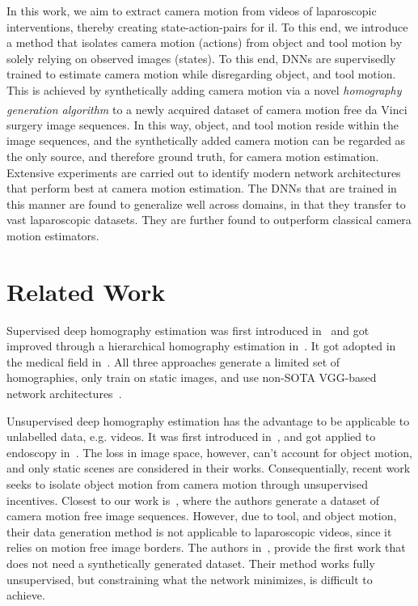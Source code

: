 In this work, we aim to extract camera motion from videos of laparoscopic interventions, thereby creating state-action-pairs for \acrshort{il}. To this end, we introduce a method that isolates camera motion (actions) from object and tool motion by solely relying on observed images (states). To this end, DNNs are supervisedly trained to estimate camera motion while disregarding object, and tool motion. This is achieved by synthetically adding camera motion via a novel \textit{homography generation algorithm} to a newly acquired dataset of camera motion free da Vinci\textsuperscript{\textregistered} surgery image sequences. In this way, object, and tool motion reside within the image sequences, and the synthetically added camera motion can be regarded as the only source, and therefore ground truth, for camera motion estimation. Extensive experiments are carried out to identify modern network architectures that perform best at camera motion estimation. The DNNs that are trained in this manner are found to generalize well across domains, in that they transfer to vast laparoscopic datasets. They are further found to outperform classical camera motion estimators.

\section{Related Work}

Supervised deep homography estimation was first introduced in~\cite{detone2016deep} and got improved through a hierarchical homography estimation in~\cite{erlik2017homography}. It got adopted in the medical field in~\cite{bano2020deep}. All three approaches generate a limited set of homographies, only train on static images, and use non-SOTA VGG-based network architectures~\cite{simonyan2014very}.

Unsupervised deep homography estimation has the advantage to be applicable to unlabelled data, e.g. videos. It was first introduced in~\cite{nguyen2018unsupervised}, and got applied to endoscopy in~\cite{gomes2019unsupervised}. The loss in image space, however, can't account for object motion, and only static scenes are considered in their works. Consequentially, recent work seeks to isolate object motion from camera motion through unsupervised incentives. Closest to our work is~\cite{le2020deep}, where the authors generate a dataset of camera motion free image sequences. However, due to tool, and object motion, their data generation method is not applicable to laparoscopic videos, since it relies on motion free image borders. The authors in~\cite{zhang2020content}, provide the first work that does not need a synthetically generated dataset. Their method works fully unsupervised, but constraining what the network minimizes, is difficult to achieve.

